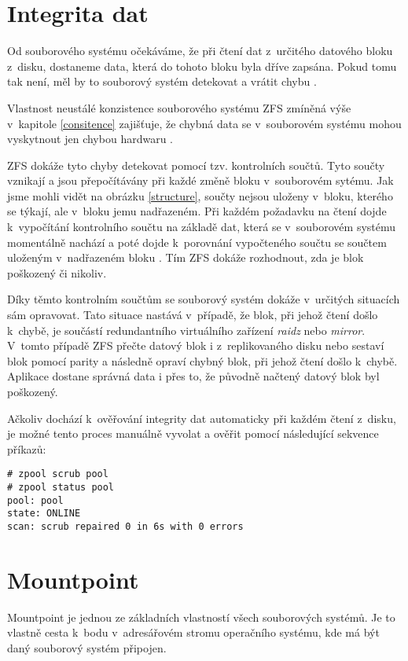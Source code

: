 \section{Integrita dat}
\label{checksum}
Od souborového systému očekáváme, že při čtení dat z~určitého datového bloku z~disku, dostaneme data, která do tohoto bloku byla dříve zapsána. Pokud tomu tak není, měl by to souborový systém detekovat a vrátit chybu \cite{integrity1}.

Vlastnost neustálé konzistence souborového systému ZFS zmíněná výše v~kapitole \ref{consitence} zajišťuje, že chybná data se v~souborovém systému mohou vyskytnout jen chybou hardwaru \cite{integrity2}.

ZFS dokáže tyto chyby detekovat pomocí tzv. kontrolních součtů. Tyto součty vznikají a jsou přepočítávány při každé změně bloku v~souborovém sytému. Jak jsme mohli vidět na obrázku \ref{structure}, součty nejsou uloženy v~bloku, kterého se týkají, ale v~bloku jemu nadřazeném. Při každém požadavku na čtení dojde k~vypočítání kontrolního součtu na základě dat, která se v~souborovém systému momentálně nachází a poté dojde k~porovnání vypočteného součtu se součtem uloženým v~nadřazeném bloku \cite{integrity1}. Tím ZFS dokáže rozhodnout, zda je blok poškozený či nikoliv.

Díky těmto kontrolním součtům se souborový systém dokáže v~určitých situacích sám opravovat. Tato situace nastává v~případě, že blok, při jehož čtení došlo k~chybě, je součástí redundantního virtuálního zařízení \emph{raidz} nebo \emph{mirror}. V~tomto případě ZFS přečte datový blok i z~replikovaného disku nebo sestaví blok pomocí parity a následně opraví chybný blok, při jehož čtení došlo k~chybě. Aplikace dostane správná data i přes to, že původně načtený datový blok byl poškozený.

Ačkoliv dochází k~ověřování integrity dat automaticky při každém čtení z~disku, je možné tento proces manuálně vyvolat a ověřit pomocí následující sekvence příkazů:
\begin{verbatim}
# zpool scrub pool
# zpool status pool
pool: pool
state: ONLINE
scan: scrub repaired 0 in 6s with 0 errors
\end{verbatim}

\section{Mountpoint}
\label{mountpoint}
Mountpoint je jednou ze základních vlastností všech souborových systémů. Je to vlastně cesta k~bodu v~adresářovém stromu operačního systému, kde má být daný souborový systém připojen.

